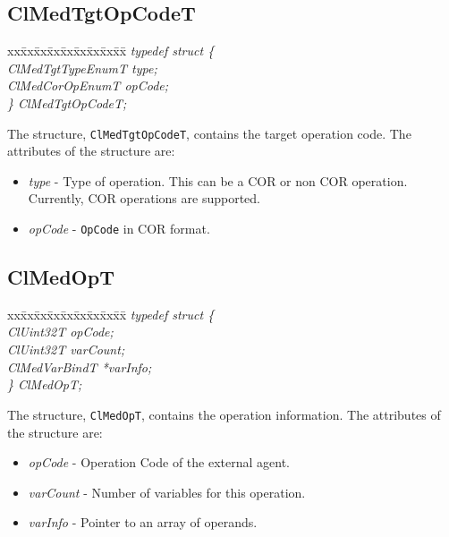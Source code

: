 \begin{flushleft}
\subsection{ClMedTgtOpCodeT}
\begin{tabbing}
xx\=xx\=xx\=xx\=xx\=xx\=xx\=xx\=xx\=\kill
\textit{typedef struct \{}\\
\>\>\>\>\textit{ClMedTgtTypeEnumT      type;}\\
\>\>\>\>\textit{ClMedCorOpEnumT     opCode;}\\
\textit{\} ClMedTgtOpCodeT;}\end{tabbing}
The structure, {\tt{ClMedTgtOpCodeT}}, contains the target operation code. The attributes of the structure are:
\begin{itemize}
\item
\textit{type} - Type of operation. This can be a COR or non COR operation. Currently, COR operations are supported.
\item
\textit{opCode} - {\tt{OpCode}} in COR format.
\end{itemize}



\subsection{ClMedOpT}
\begin{tabbing}
xx\=xx\=xx\=xx\=xx\=xx\=xx\=xx\=xx\=\kill
\textit{typedef struct \{}\\
\>\>\>\>\textit{ClUint32T opCode;}\\
\>\>\>\>\textit{ClUint32T varCount;}\\
\>\>\>\>\textit{ClMedVarBindT *varInfo;}\\
\textit{\} ClMedOpT;}\end{tabbing}
The structure, {\tt{ClMedOpT}}, contains the operation information. The attributes of the structure are:
\begin{itemize}
\item
\textit{opCode} - Operation Code of the external agent.
\item 
\textit{varCount} - Number of variables for this operation.
\item
\textit{varInfo} - Pointer to an array of operands.
\end{itemize}



\end{flushleft}
